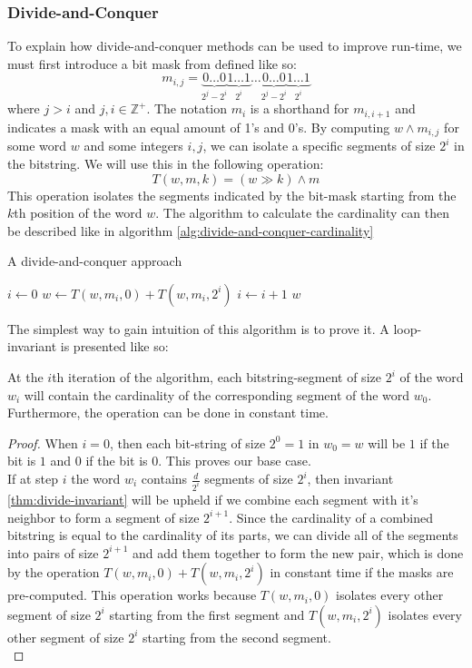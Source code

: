 \subsubsection{Divide-and-Conquer}
To explain how divide-and-conquer methods can be used to improve run-time, we must first introduce a bit mask from \cite{fast-similarity-search} defined like so:
$$m_{i,j} = \underbrace{0\dots 0}_{2^{j}-2^{i}}\underbrace{1\dots 1}_{2^i}\dots\underbrace{0\dots 0}_{2^{j}-2^{i}}\underbrace{1\dots 1}_{2^i}$$
where $j > i$ and $j, i \in \mathbb{Z}^+$. The notation $m_{i}$ is a shorthand for $m_{i, i+1}$ and indicates a mask with an equal amount of 1's and 0's. By computing $w \land m_{i,j}$ for some word $w$ and some integers $i, j$, we can isolate a specific segments of size $2^i$ in the bitstring.
We will use this in the following operation:
\begin{equation}
    T(w, m, k) = (w\gg k) \land m
\end{equation}
This operation isolates the segments indicated by the bit-mask starting from the $k$th position of the word $w$.
The algorithm to calculate the cardinality can then be described like in algorithm \ref{alg:divide-and-conquer-cardinality}
\begin{algorithm}[H]
\caption{A divide-and-conquer approach}\label{alg:divide-and-conquer-cardinality}
\begin{algorithmic}[1]
 
\State $i \gets 0$
\State $w \gets T(w, m_i, 0) + T(w, m_i, 2^i)$
\State $i \gets i + 1$
\EndWhile
\State \Return $w$
\EndFunction
\end{algorithmic}
\end{algorithm}
The simplest way to gain intuition of this algorithm is to prove it. A loop-invariant is presented like so:
\begin{invariant}
\label{thm:divide-invariant}
At the $i$th iteration of the algorithm, each bitstring-segment of size $2^i$ of the word $w_i$ will contain the cardinality of the corresponding segment of the word $w_0$. Furthermore, the operation can be done in constant time.
\end{invariant}
\begin{proof}
    When $i=0$, then each bit-string of size $2^0=1$ in $w_0 = w$ will be $1$ if the bit is $1$ and $0$ if the bit is $0$. This proves our base case. \\
    If at step $i$ the word $w_i$ contains $\frac{d}{2^i}$ segments of size $2^i$, then invariant \ref{thm:divide-invariant} will be upheld if we combine each segment with it's neighbor to form a segment of size $2^{i+1}$. Since the cardinality of a combined bitstring is equal to the cardinality of its parts, we can divide all of the segments into pairs of size $2^{i+1}$ and add them together to form the new pair, which is done by the operation $T(w, m_i, 0) + T(w, m_i, 2^i)$ in constant time if the masks are pre-computed. This operation works because $T(w, m_i, 0)$ isolates every other segment of size $2^i$ starting from the first segment and $T(w, m_i, 2^i)$ isolates every other segment of size $2^i$ starting from the second segment.\\
\end{proof}
